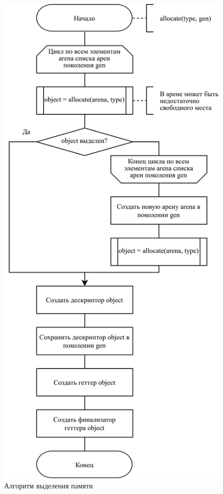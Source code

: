 \begin{figure}[H]
	\centering
	\includegraphics[scale=0.19]{assets/allocate.png}
	\caption{Алгоритм выделения памяти}
	\label{fig:allocation}
\end{figure}

